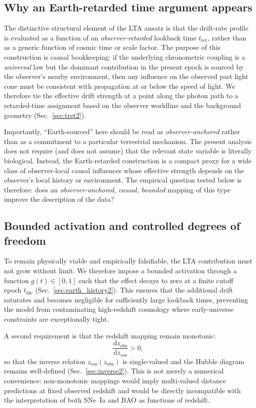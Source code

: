 \documentclass[10pt]{article}
\newcommand{\zobs}{z_{\mathrm{obs}}}
\newcommand{\zcos}{z_{\mathrm{cos}}}
\newcommand{\tret}{t_{\mathrm{ret}}}
\newcommand{\tL}{t_{\mathrm{life}}}
\providecommand{\dd}{\mathrm{d}}
\begin{document}
\subsection{Why an Earth-retarded time argument appears}

The distinctive structural element of the LTA ansatz is that the drift-rate profile is evaluated as
a function of an \emph{observer-retarded} lookback time \(\tret\), rather than as a generic function
of cosmic time or scale factor.
The purpose of this construction is causal bookkeeping: if the underlying chronometric coupling is
a \emph{universal} law but the dominant contribution in the present epoch is sourced by the
observer’s nearby environment, then any influence on the observed past light cone must be
consistent with propagation at or below the speed of light.
We therefore tie the effective drift strength at a point along the photon path to a retarded-time
assignment based on the observer worldline and the background geometry (Sec.~\ref{sec:tret2}).

Importantly, ``Earth-sourced'' here should be read as \emph{observer-anchored} rather than as a
commitment to a particular terrestrial mechanism.
The present analysis does not require (and does not assume) that the relevant state variable is
literally biological.
Instead, the Earth-retarded construction is a compact proxy for a wide class of observer-local
causal influences whose effective strength depends on the observer’s local history or environment.
The empirical question tested below is therefore: does an \emph{observer-anchored, causal, bounded}
mapping of this type improve the description of the data?

\subsection{Bounded activation and controlled degrees of freedom}

To remain physically viable and empirically falsifiable, the LTA contribution must not grow without
limit.
We therefore impose a bounded activation through a function $g(t)\in[0,1]$ such that the effect
decays to zero at a finite cutoff epoch $\tL$ (Sec.~\ref{sec:earth_history2}).
This ensures that the additional drift saturates and becomes negligible for sufficiently large
lookback times, preventing the model from contaminating high-redshift cosmology where early-universe
constraints are exceptionally tight.

A second requirement is that the redshift mapping remain monotonic:
\begin{equation}
\frac{\dd \zobs}{\dd \zcos} > 0,
\end{equation}
so that the inverse relation $\zcos(\zobs)$ is single-valued and the Hubble diagram remains
well-defined (Sec.~\ref{sec:inverse2}).
This is not merely a numerical convenience: non-monotonic mappings would imply multi-valued distance
predictions at fixed observed redshift and would be directly incompatible with the interpretation of
both SNe~Ia and BAO as functions of redshift.
\end{document}
